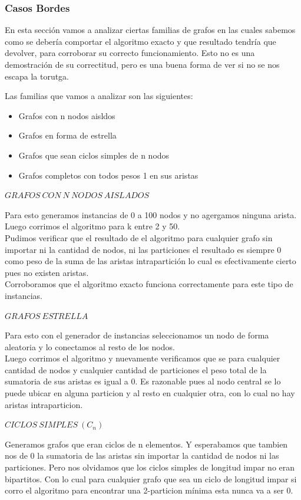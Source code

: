 \subsubsection{Casos Bordes}

En esta secci\'on vamos a analizar ciertas familias de grafos en las cuales sabemos como se deber\'ia comportar el algoritmo exacto y que resultado tendr\'ia que devolver, para corroborar su correcto funcionamiento.
Esto no es una demostraci\'on de su correctitud, pero es una buena forma de ver si no se nos escapa la torutga.

Las familias que vamos a analizar son las siguientes:

\begin{itemize}
	\item Grafos con n nodos aisldos
	\item Grafos en forma de estrella
	\item Grafos que sean ciclos simples de n nodos
	\item Grafos completos con todos pesos 1 en sus aristas
\end{itemize}

$GRAFOS \ CON \ N \ NODOS\ AISLADOS$

Para esto generamos instancias de 0 a 100 nodos y no agergamos ninguna arista. Luego corrimos el algoritmo para k entre 2 y 50.\\
Pudimos verificar que el resultado de el algoritmo para cualquier grafo sin importar ni la cantidad de nodos, ni las particiones el resultado es siempre 0 como peso de la suma de las aristas intrapartici\'on lo cual es efectivamente cierto pues no existen aristas.\\

Corroboramos que el algoritmo exacto funciona correctamente para este tipo de instancias.

$GRAFOS\ ESTRELLA$

Para esto con el generador de instancias seleccionamos un nodo de forma aleatoria y lo conectamos al resto de los nodos.\\
Luego corrimos el algoritmo y nuevamente verificamos que se para cualquier cantidad de nodos y cualquier cantidad de particiones el peso total de la sumatoria de sus aristas es igual a 0.
Es razonable pues al nodo central se lo puede ubicar en alguna particion y al resto en cualquier otra, con lo cual no hay aristas intraparticion.

$CICLOS\ SIMPLES\ (C_n)$

Generamos grafos que eran ciclos de n elementos. Y esperabamos que tambien nos de 0 la sumatoria de las aristas sin importar la cantidad de nodos ni las particiones. Pero nos olvidamos que los ciclos simples de longitud impar no eran bipartitos. Con lo cual para cualquier grafo que sea un ciclo de longitud impar si corro el algoritmo para encontrar una 2-particion m\'inima esta nunca va a ser 0.

